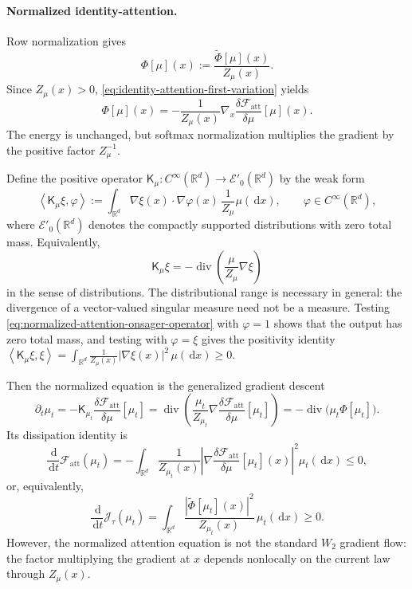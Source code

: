 \documentclass[11pt]{amsart}
\numberwithin{equation}{section}
\theoremstyle{plain}
\newcommand{\R}{\mathbb{R}}
\newcommand{\dd}{\,\mathrm{d}}
\newcommand{\abs}[1]{\left\lvert#1\right\rvert}
\DeclareMathOperator{\diver}{div}
\begin{document}
\paragraph{\textbf{Normalized identity-attention.}}
Row normalization gives
\begin{equation}\label{eq:normalized-identity-attention-field}
 \Phi[\mu](x)
 :=\frac{\widetilde\Phi[\mu](x)}{Z_\mu(x)}.
\end{equation}
Since $Z_\mu(x)>0$, \eqref{eq:identity-attention-first-variation} yields
\[
 \Phi[\mu](x)
 =-\frac1{Z_\mu(x)}
 \nabla_x\frac{\delta\mathcal F_{\mathrm{att}}}{\delta\mu}[\mu](x).
\]
The energy is unchanged, but softmax normalization multiplies the
gradient by the positive factor $Z_\mu^{-1}$.  

Define the positive operator $\mathsf K_\mu: C^\infty(\R^d) \to \mathcal E'_0(\R^d)$ by the weak form
\begin{equation}\label{eq:normalized-attention-onsager-operator}
 \left\langle\mathsf K_\mu\xi,\varphi\right\rangle
 :=\int_{\R^d}\nabla\xi(x)\cdot\nabla\varphi(x)\,\frac{1}{Z_\mu}\mu(\dd x),
 \qquad \varphi\in C^\infty(\R^d),
\end{equation}
where $\mathcal E'_0(\R^d)$ denotes the compactly supported distributions
with zero total mass. Equivalently, 
 \[
 \mathsf K_\mu\xi
 =-\diver\left(\frac{\mu}{Z_\mu}\nabla\xi\right)
\]
in the sense of distributions. The distributional range is necessary in
general: the divergence of a vector-valued singular measure need not be a
measure.  Testing \eqref{eq:normalized-attention-onsager-operator} with
$\varphi=1$ shows that the output has zero total mass, and testing with
$\varphi=\xi$ gives the positivity identity
$
 \left\langle\mathsf K_\mu\xi,\xi\right\rangle
 =\int_{\R^d}\frac{1}{Z_\mu(x)}\abs{\nabla\xi(x)}^2\,\mu(\dd x)
 \geq0.
 $


Then the normalized equation is the generalized gradient descent
\begin{equation}\label{eq:normalized-attention-generalized-gradient-flow}
 \partial_t\mu_t
 =-\mathsf K_{\mu_t}
 \frac{\delta\mathcal F_{\mathrm{att}}}{\delta\mu}[\mu_t]
 =\diver\left(\frac{\mu_t}{Z_{\mu_t}}
 \nabla\frac{\delta\mathcal F_{\mathrm{att}}}{\delta\mu}[\mu_t]\right)
 =-\diver\bigl(\mu_t\Phi[\mu_t]\bigr).
\end{equation}
Its dissipation identity is
\[
 \frac{\dd}{\dd t}\mathcal F_{\mathrm{att}}(\mu_t)
 =-\int_{\R^d}\frac1{Z_{\mu_t}(x)}
 \left|\nabla
 \frac{\delta\mathcal F_{\mathrm{att}}}{\delta\mu}[\mu_t](x)
 \right|^2\mu_t(\dd x)\leq0,
\]
or, equivalently,
\begin{equation}\label{eq:normalized-attention-energy-ascent}
 \frac{\dd}{\dd t}\mathcal J_\tau(\mu_t)
 =\int_{\R^d}\frac{\left|\widetilde\Phi[\mu_t](x)\right|^2}
 {Z_{\mu_t}(x)}\,\mu_t(\dd x)\geq0.
\end{equation}
However, the normalized attention equation is not the standard $W_2$ gradient flow: the factor multiplying the gradient at $x$ depends nonlocally on the current law through $Z_\mu(x)$.
\end{document}
